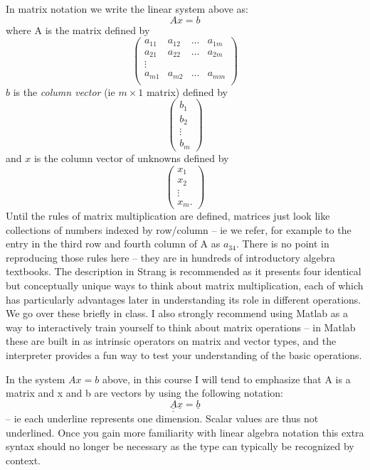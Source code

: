 \documentclass[11pt]{article}
\begin{document}
In matrix notation we write the linear system above as:
\begin{equation}
Ax=b
\end{equation}
where A is the matrix defined by
\[ \left( \begin{array}{cccc}
a_{11} & a_{12} & \ldots & a_{1m} \\
a_{21} & a_{22} & \ldots & a_{2m} \\
\vdots &  &  &  \\
a_{m1} & a_{m2} & \ldots & a_{mm} \\
 \end{array} \right)\]
$b$ is the {\em column vector} (ie $m \times 1$ matrix) defined by
\[ \left( \begin{array}{c}
b_1 \\
b_2 \\
\vdots \\
b_m
 \end{array} \right)\]
 and $x$ is the column vector of unknowns defined by
\[ \left( \begin{array}{c}
x_1 \\
x_2 \\
\vdots \\
x_m.
 \end{array} \right)\]
 Until the rules of matrix multiplication are defined, matrices just look like collections of numbers indexed by row/column --
 ie we refer, for example to the entry in the third row and fourth column of A as $a_{34}$. There is no point in reproducing
 those rules here -- they are in hundreds of introductory algebra textbooks. The description in Strang is recommended as
 it presents four identical but conceptually unique ways to think about matrix multiplication, each of which has particularly
 advantages later in understanding its role in different operations. We go over these briefly in class. I also strongly recommend
 using Matlab as a way to interactively train yourself to think about matrix operations -- in Matlab these are built in as intrinsic
 operators on matrix and vector types, and the interpreter provides a fun way to test your understanding of the basic operations.
 
 In the system $Ax=b$ above, in this course I will tend to emphasize that A is a matrix and x and b are vectors by using the following
 notation:
 \begin{equation}
\underline{\underline{A}} \underline{x} = \underline{b}
 \end{equation}
 -- ie each underline represents one dimension. Scalar values are thus not underlined. Once you gain more familiarity with linear
 algebra notation this extra syntax should no longer be necessary as the type can typically be recognized by context.
 
\end{document}
